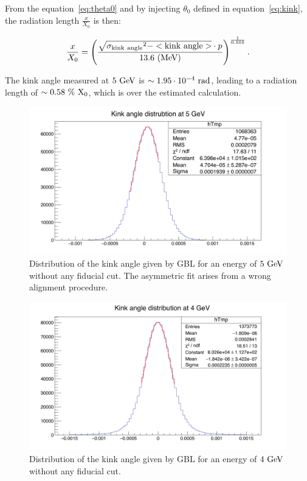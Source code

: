    From the equation~\ref{eq:theta0} and by injecting $\theta_0$ defined in equation~\ref{eq:kink}, the radiation length $\frac{x}{X_0}$ is then:
   
   \begin{equation}
     \frac{x}{X_{0}} = \left( \frac{\sqrt{\rm{\sigma_{kink~angle}}^2 - <\rm{kink~angle}>} \cdot p}{13.6~\rm{(MeV)}} \right)^{\frac{1}{0.555}}.
   \end{equation}

   The kink angle measured at $5~\rm{GeV}$ is $\sim 1.95 \cdot 10^{-4}~\rm{rad}$, leading to a radiation length of $\sim 0.58~\%~\rm{X_0}$, which is over the estimated calculation.
   
   \begin{figure}[!h]
     \centering
     \includegraphics[width = \textwidth]{Pictures/X0/kinkAngle5GeV_2.png}
     \caption{Distribution of the kink angle given by GBL for an energy of $5~\rm{GeV}$ without any fiducial cut. The asymmetric fit arises from a wrong alignment procedure.}
     \label{fig:kinkAngle5GeV}
   \end{figure} 

   \begin{figure}[!p]
     \centering
     \includegraphics[width = \textwidth]{Pictures/X0/kinkAngle4GeV.png}
     \caption{Distribution of the kink angle given by GBL for an energy of $4~\rm{GeV}$ without any fiducial cut.}
     \label{fig:kinkAngle4GeV}
   \end{figure} 

